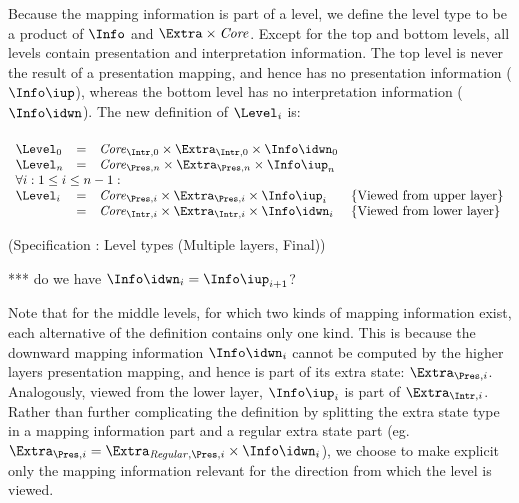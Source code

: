 Because the mapping information is part of a level, we define the level type to be a product of $\Info$ and 
$\Extra \times \Core$. Except for the top and bottom levels, all levels contain presentation and interpretation information. The top level is never the result of a presentation mapping, and hence has no presentation information ($\Info\iup$), whereas the bottom level has no interpretation information ($\Info\idwn$). The new definition of $\Level_i$ is:

\begin{small}
 \label{spec:levelMultiFinal}
\begin{align*}%
\end{align*} 
\(\begin{array}{lcll}
\Level_{0} & = & \Core_{\Intr,0} \times \Extra_{\Intr,0} \times \Info\idwn_{0} \\
\Level_{n} & = & \Core_{\Pres,n} \times \Extra_{\Pres,n} \times  \Info\iup_{n}\\
\lefteqn{\forall i:1 \le i \le n-1:}  \\
\Level_{i} & = & \Core_{\Pres,i} \times \Extra_{\Pres,i}  \times \Info\iup_{i} & \text{\{Viewed from upper layer\}}\\  
               & = & \Core_{\Intr,i} \times \Extra_{\Intr,i} \times \Info\idwn_{i} & \text{\{Viewed from lower layer\}}
\end{array}\)\end{small}
\begin{center}(Specification \thespecification: Level types (Multiple layers, Final))\end{center}\vspace{1em}

*** do we have $\Info\idwn_i = \Info\iup_{i+1}$?

Note that for the middle levels, for which two kinds of mapping information exist, each alternative of the definition contains only one kind. This is because the downward mapping information $\Info\idwn_{i}$ cannot be computed by the higher layers presentation mapping, and hence is part of its extra state: $\Extra_{\Pres,i}$. Analogously, viewed from the lower layer, $\Info\iup_{i}$ is part of $\Extra_{\Intr,i}$. Rather than further complicating the definition by splitting the extra state type in a mapping information part and a regular extra state part (eg. $\Extra_{\Pres,i} = \Extra_{\mathit{Regular},\Pres,i} \times \Info\idwn_{i}$), we choose to make explicit only the mapping information relevant for the direction from which the level is viewed.
\ec

